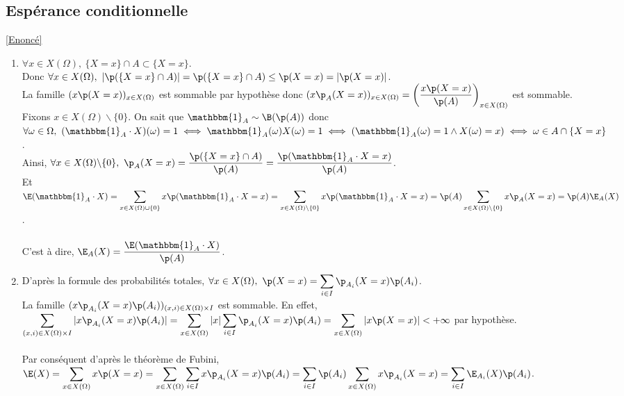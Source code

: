 \documentclass[8pt]{book}
\begin{document}
	\subsection{Espérance conditionnelle }
	\label{Espérance conditionnelle corrigé}
		\textcolor{blue}{\hyperref[Espérance conditionnelle]{[Enoncé]}}\\
	\begin{enumerate}
		\item $\forall x\in X(\Omega),\ \{X=x\}\cap A\subset \{X=x\}$.\\
		Donc $\forall x\in X(\Omega),\ |\p(\{X=x\}\cap A)|=\p(\{X=x\}\cap A)\leq \p(X=x)=|\p(X=x)|$.\\
		La famille $(x\p(X=x))_{x\in X(\Omega)}$ est sommable par hypothèse donc $(x\p_A(X=x))_{x\in X(\Omega)}=\left(\displaystyle\frac{x\p(X=x)}{\p(A)}\right)_{x\in X(\Omega)}$ est sommable.\\
		Fixons $x\in X(\Omega)\backslash\{0\}$. On sait que $\mathbbm{1}_A\sim\B(\p(A))$ donc $\forall \omega\in \Omega,\ (\mathbbm{1}_A\cdot X)(\omega)=1\iff \mathbbm{1}_A(\omega)X(\omega)=1\iff (\mathbbm{1}_A(\omega)=1\land X(\omega)=x)\iff \omega\in A\cap\{X=x\}$.\\
		Ainsi, $\forall x\in X(\Omega)\backslash\{0\},\ \p_A(X=x)=\displaystyle\frac{\p(\{X=x\}\cap A)}{\p(A)}=\frac{\p(\mathbbm{1}_A\cdot X=x)}{\p(A)}$.\\
		Et $\E(\mathbbm{1}_A\cdot X)=\displaystyle\sum\limits_{x\in X(\Omega)\cup\{0\}}x\p(\mathbbm{1}_A\cdot X=x)=\sum\limits_{x\in X(\Omega)\backslash\{0\}}x\p(\mathbbm{1}_A\cdot X=x)=\p(A)\sum\limits_{x\in X(\Omega)\backslash\{0\}}x\p_A(X=x)=\p(A)\E_A(X)$.\\\\
		C'est à dire, $\E_A(X)=\displaystyle\frac{\E(\mathbbm{1}_A\cdot X)}{\p(A)}$.
		\item D'après la formule des probabilités totales, $\forall x\in X(\Omega),\ \p(X=x)=\displaystyle\sum\limits_{i\in I}\p_{A_i}(X=x)\p(A_i)$.\\
		La famille $(x\p_{A_i}(X=x)\p(A_i))_{(x,i)\in X(\Omega)\times I}$ est sommable. En effet,\\
		$\displaystyle\sum\limits_{(x,i)\in X(\Omega)\times I}|x\p_{A_i}(X=x)\p(A_i)|=\sum\limits_{x\in X(\Omega)}|x|\sum\limits_{i\in I}\p_{A_i}(X=x)\p(A_i)=\sum\limits_{x\in X(\Omega)}|x\p(X=x)|<+\infty$ par hypothèse.\\\\
		Par conséquent d'après le théorème de Fubini,\\
		$\E(X)=\displaystyle\sum\limits_{x\in X(\Omega)}x\p(X=x)=\sum\limits_{x\in X(\Omega)}\sum\limits_{i\in I}x\p_{A_i}(X=x)\p(A_i)=\sum\limits_{i\in I}\p(A_i)\sum\limits_{x\in X(\Omega)}x\p_{A_i}(X=x)=\sum\limits_{i\in I}\E_{A_i}(X)\p(A_i)$.
	\end{enumerate}
	
\end{document}

